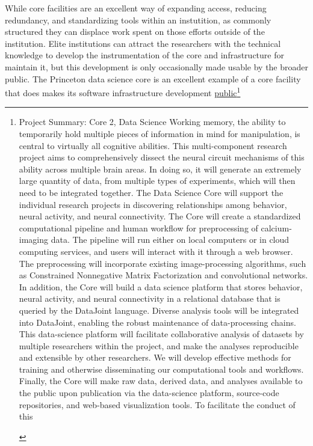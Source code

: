 \documentclass[10pt]{article}
\begin{document}
\begin{multicols}{2}
While core facilities are an excellent way of expanding access, reducing
redundancy, and standardizing tools within an instutition, as commonly
structured they can displace work spent on those efforts outside of the
institution. Elite institutions can attract the researchers with the
technical knowledge to develop the instrumentation of the core and
infrastructure for maintain it, but this development is only
occasionally made usable by the broader public. The Princeton data
science core is an excellent example of a core facility that does makes
its software infrastructure development
\href{https://github.com/BrainCOGS}{public}\footnote{\begin{leftbar}
  Project Summary: Core 2, Data Science Working memory, the ability to
  temporarily hold multiple pieces of information in mind for
  manipulation, is central to virtually all cognitive abilities. This
  multi-component research project aims to comprehensively dissect the
  neural circuit mechanisms of this ability across multiple brain areas.
  In doing so, it will generate an extremely large quantity of data,
  from multiple types of experiments, which will then need to be
  integrated together. The Data Science Core will support the individual
  research projects in discovering relationships among behavior, neural
  activity, and neural connectivity. The Core will create a standardized
  computational pipeline and human workflow for preprocessing of
  calcium-imaging data. The pipeline will run either on local computers
  or in cloud computing services, and users will interact with it
  through a web browser. The preprocessing will incorporate existing
  image-processing algorithms, such as Constrained Nonnegative Matrix
  Factorization and convolutional networks. In addition, the Core will
  build a data science platform that stores behavior, neural activity,
  and neural connectivity in a relational database that is queried by
  the DataJoint language. Diverse analysis tools will be integrated into
  DataJoint, enabling the robust maintenance of data-processing chains.
  This data-science platform will facilitate collaborative analysis of
  datasets by multiple researchers within the project, and make the
  analyses reproducible and extensible by other researchers. We will
  develop effective methods for training and otherwise disseminating our
  computational tools and workflows. Finally, the Core will make raw
  data, derived data, and analyses available to the public upon
  publication via the data-science platform, source-code repositories,
  and web-based visualization tools. To facilitate the conduct of this

\end{leftbar}}
\end{multicols}
\end{document}
